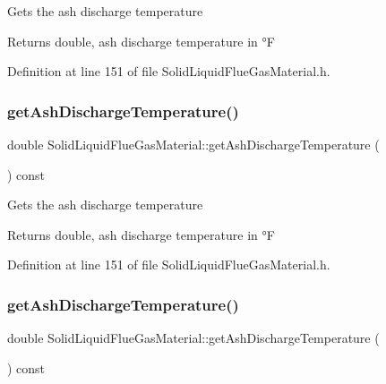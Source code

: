 Gets the ash discharge temperature \begin{DoxyReturn}{Returns}
double, ash discharge temperature in °F 
\end{DoxyReturn}


Definition at line 151 of file Solid\+Liquid\+Flue\+Gas\+Material.\+h.

\mbox{\label{class_solid_liquid_flue_gas_material_ab233d4e27397cc74fbe2d3084e4e6f7c}} 
\subsubsection{\texorpdfstring{get\+Ash\+Discharge\+Temperature()}{getAshDischargeTemperature()}\hspace{0.1cm}{\footnotesize\ttfamily [2/3]}}
{\footnotesize\ttfamily double Solid\+Liquid\+Flue\+Gas\+Material\+::get\+Ash\+Discharge\+Temperature (\begin{DoxyParamCaption}{ }\end{DoxyParamCaption}) const\hspace{0.3cm}{\ttfamily [inline]}}

Gets the ash discharge temperature \begin{DoxyReturn}{Returns}
double, ash discharge temperature in °F 
\end{DoxyReturn}


Definition at line 151 of file Solid\+Liquid\+Flue\+Gas\+Material.\+h.

\mbox{\label{class_solid_liquid_flue_gas_material_ab233d4e27397cc74fbe2d3084e4e6f7c}} 
\subsubsection{\texorpdfstring{get\+Ash\+Discharge\+Temperature()}{getAshDischargeTemperature()}\hspace{0.1cm}{\footnotesize\ttfamily [3/3]}}
{\footnotesize\ttfamily double Solid\+Liquid\+Flue\+Gas\+Material\+::get\+Ash\+Discharge\+Temperature (\begin{DoxyParamCaption}{ }\end{DoxyParamCaption}) const\hspace{0.3cm}{\ttfamily [inline]}}

